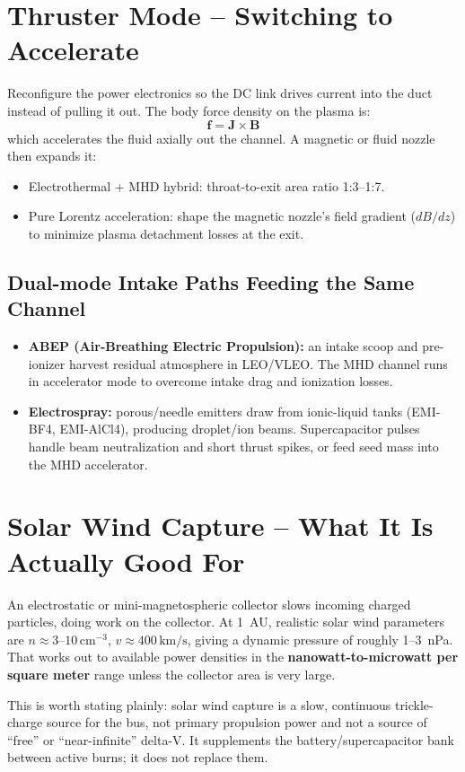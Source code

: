 \documentclass[12pt]{article}
\begin{document}
\section{Thruster Mode -- Switching to Accelerate}
Reconfigure the power electronics so the DC link drives current into the duct instead of pulling it out. The body force density on the plasma is:
\[
\mathbf{f} = \mathbf{J} \times \mathbf{B}
\]
which accelerates the fluid axially out the channel. A magnetic or fluid nozzle then expands it:
\begin{itemize}
    \item Electrothermal + MHD hybrid: throat-to-exit area ratio 1:3--1:7.
    \item Pure Lorentz acceleration: shape the magnetic nozzle's field gradient ($dB/dz$) to minimize plasma detachment losses at the exit.
\end{itemize}

\subsection{Dual-mode Intake Paths Feeding the Same Channel}
\begin{itemize}
    \item \textbf{ABEP (Air-Breathing Electric Propulsion):} an intake scoop and pre-ionizer harvest residual atmosphere in LEO/VLEO. The MHD channel runs in accelerator mode to overcome intake drag and ionization losses.
    \item \textbf{Electrospray:} porous/needle emitters draw from ionic-liquid tanks (EMI-BF4, EMI-AlCl4), producing droplet/ion beams. Supercapacitor pulses handle beam neutralization and short thrust spikes, or feed seed mass into the MHD accelerator.
\end{itemize}

\section{Solar Wind Capture -- What It Is Actually Good For}
An electrostatic or mini-magnetospheric collector slows incoming charged particles, doing work on the collector. At 1~AU, realistic solar wind parameters are $n \approx 3$--$10\,\text{cm}^{-3}$, $v \approx 400\,\text{km/s}$, giving a dynamic pressure of roughly 1--3~nPa. That works out to available power densities in the \textbf{nanowatt-to-microwatt per square meter} range unless the collector area is very large.

This is worth stating plainly: solar wind capture is a slow, continuous trickle-charge source for the bus, not primary propulsion power and not a source of ``free'' or ``near-infinite'' delta-V. It supplements the battery/supercapacitor bank between active burns; it does not replace them.
\end{document}
